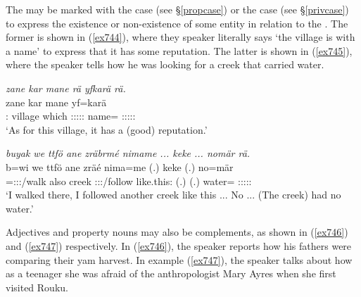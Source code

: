 The  may be marked with the  case (see \S\ref{propcase}) or the  case (see \S\ref{privcase}) to express the existence or non-existence of some entity in relation to the  . The former is shown in (\ref{ex744}), where they speaker literally says `the village is with a name' to express that it has some reputation. The latter is shown in (\ref{ex745}), where the speaker tells how he was looking for a creek that carried water.

\begin{exe}
	\ex \emph{zane kar mane rä yfkarä rä.}\\
	\gll zane kar mane  yf=karä \\
	\Dem:\Prox{} village which \Tsg:\F:\Sbj:\Nonpast:\Ipfv:\Cop{} name=\Prop{} \Tsg:\F:\Sbj:\Nonpast:\Ipfv:\Cop{}\\
	\trans `As for this village, it has a (good) reputation.'
	\label{ex744}
\end{exe}
\begin{exe}
	\ex \emph{buyak we ttfö ane zräbrmé nimame ... keke ... nomär rä.}\\
	\gll b=wi we ttfö ane zräé nima=me (.) keke (.) no=mär \\
	\Med=\Fsg:\Sbj:\Nonpast:\Ipfv/walk also creek \Dem{} \Fsg:\Sbj:\Irr:\Pfv/follow like.this:\Ins{} (.) \Neg{} (.) water=\Priv{} \Tsg:\F:\Sbj:\Nonpast:\Ipfv:\Cop\\
	\trans `I walked there, I followed another creek like this ... No ... (The creek) had no water.'
	\label{ex745}
\end{exe}

Adjectives and property nouns may also be  complements, as shown in (\ref{ex746}) and (\ref{ex747}) respectively. In (\ref{ex746}), the speaker reports how his fathers were comparing their yam harvest. In example (\ref{ex747}), the speaker talks about how as a teenager she was afraid of the anthropologist Mary Ayres when she first visited Rouku.

